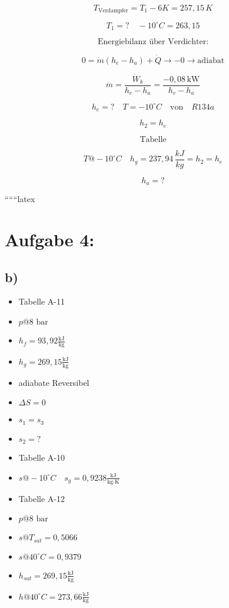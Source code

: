\[
T_{\text{Verdampfer}} = T_1 - 6K = 257,15 \, K
\]

\[
T_1 = ? \quad -10^\circ C = 263,15
\]

\[
\text{Energiebilanz über Verdichter:}
\]

\[
0 = \dot{m} (h_e - h_a) + \dot{Q} \rightarrow -0 \rightarrow \text{adiabat}
\]

\[
\dot{m} = \frac{\dot{W}_k}{h_e - h_a} = \frac{-0,08 \, \text{kW}}{h_e - h_a}
\]

\[
h_e = ? \quad T = -10^\circ C \quad \text{von} \quad R134a
\]

\[
h_2 = h_e
\]

\[
\text{Tabelle}
\]

\[
T@ -10^\circ C \quad h_g = 237,94 \, \frac{kJ}{kg} = h_2 = h_e
\]

\[
h_a = ?
\]

``````latex


\section*{Aufgabe 4:}

\subsection*{b)}

\begin{itemize}
    \item Tabelle A-11
    \item $p@8 \text{ bar}$
    \item $h_f = 93,92 \frac{\text{kJ}}{\text{kg}}$
    \item $h_g = 269,15 \frac{\text{kJ}}{\text{kg}}$
    \item adiabate Reversibel
    \item $\Delta S = 0$
    \item $s_1 = s_3$
    \item $s_2 = ?$
\end{itemize}

\begin{itemize}
    \item Tabelle A-10
    \item $s@-10^\circ C \quad s_g = 0,9238 \frac{\text{kJ}}{\text{kg} \cdot \text{K}}$
    \item Tabelle A-12
    \item $p@8 \text{ bar}$
    \item $s@T_{sat} = 0,5066$
    \item $s@40^\circ C = 0,9379$
    \item $h_{sat} = 269,15 \frac{\text{kJ}}{\text{kg}}$
    \item $h@40^\circ C = 273,66 \frac{\text{kJ}}{\text{kg}}$
\end{itemize}

